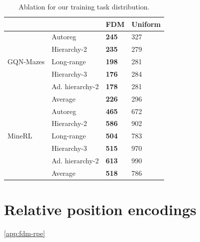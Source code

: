 \begin{table}[h]
    \centering
    \small
    \caption{Ablation for our training task distribution.}
    \label{tab:fdm-task-dist-ablation}
    \begin{tabular}{l|l|ll}
    \toprule
        ~ & ~ & FDM & Uniform \\%
        \midrule
        \multirow{5}{*}{GQN-Mazes} & Autoreg & \textbf{245} & 327 \\%
        ~ & Hierarchy-2 & \textbf{235} & 279 \\%
        ~ & Long-range & \textbf{198} & 281 \\%
        ~ & Hierarchy-3 & \textbf{176} & 284 \\%
        ~ & Ad. hierarchy-2 & \textbf{178} & 281 \\%
        ~ & Average & \textbf{226} & 296 \\%
        \midrule
        ~ & Autoreg & \textbf{465} & 672 \\%
        ~ & Hierarchy-2 & \textbf{586} & 902 \\%
        MineRL & Long-range & \textbf{504} & 783 \\%
        ~ & Hierarchy-3 & \textbf{515} & 970 \\%
        ~ & Ad. hierarchy-2 & \textbf{613} & 990 \\%
        ~ & Average & \textbf{518} & 786 \\%
        \bottomrule
    \end{tabular}
\end{table}


\section{Relative position encodings} \cref{app:fdm-rpe}

